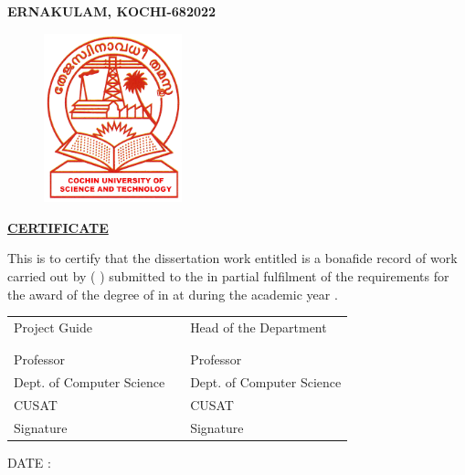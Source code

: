 \thispagestyle{empty}

\begin{center}
    {\large \bfseries \MakeUppercase {\mydep}\par}
    {\large \bfseries \MakeUppercase {\myuni}\par}
    {\large \bfseries \MakeUppercase {ERNAKULAM, KOCHI-682022}\par}

    \vspace{0.5\baselineskip}
    {\begin{figure}[!h] 
	\centering
	\includegraphics[width=40mm]{./Images/cusat.png} 
     \end{figure}
    }
    {\Large \bfseries  \MakeUppercase{\underline {certificate}}\par}
\end{center}

\vspace{\baselineskip}

\noindent
This is to certify that the dissertation work entitled \mytitle{} is a bonafide record of work carried out by \myname{} ( \myregnum{} ) submitted to the \mydep{} in partial fulfilment of the requirements for the award of the degree of \mydegree{} in \myspecialization{} at \myuni{} during the academic year \myyear{}.

\vspace{2\baselineskip}

\noindent
\begin{tabularx}{\textwidth}{@{}l  X  l}
    Project Guide & & Head of the Department\\
    \\
    \textbf{\myguide{}} & & \textbf{\myhod{}}\\
    Professor & & Professor\\
    Dept. of Computer Science & & Dept. of Computer Science\\
    CUSAT & & CUSAT\\
    Signature & & Signature
\end{tabularx}

\vspace{4\baselineskip}
\noindent
{DATE : \mydate{} \mymonth{} \myyear{} \par}
